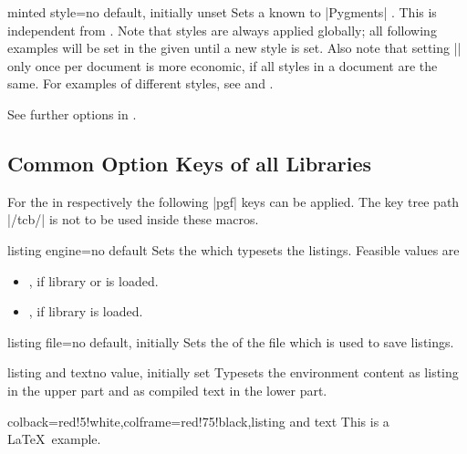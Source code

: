 \begin{docTcbKey}{minted style}{=}{no default, initially unset}
Sets a  known to |Pygments| \cite{pygments:web}. This is
independent from . Note that styles are always
applied globally; all following examples will be set in the given 
until a new style is set. Also note that
setting |\usemintedstyle| only once per document is more economic, if
all styles in a document are the same.
For examples of different styles, see
 and .
\end{docTcbKey}

See further options in .



\clearpage
\subsection{Common Option Keys of all Libraries}\label{sec:commonlistingkeys}
For the  in  respectively 
the following |pgf| keys can be applied. The key tree path |/tcb/| is not to
be used inside these macros.

\begin{docTcbKey}{listing engine}{=}{no default}
  Sets the  which typesets the listings. Feasible values are
  \begin{itemize}
  \item{}, if library  or
   is loaded.
  \item{}, if library  is loaded.
  \end{itemize}
\end{docTcbKey}

\begin{docTcbKey}{listing file}{=}{no default, initially }
  Sets the  of the file which is used to save listings.
\end{docTcbKey}


\begin{docTcbKey}{listing and text}{}{no value, initially set}
  Typesets the environment content as listing in the upper part and
  as compiled text in the lower part.
\begin{dispExample}
\begin{tcblisting}{colback=red!5!white,colframe=red!75!black,listing and text}
This is a \LaTeX\ example.
\end{tcblisting}
\end{dispExample}
\end{docTcbKey}


